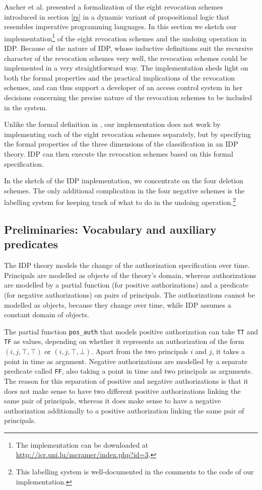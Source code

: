 \documentclass[runningheads]{llncs}
\begin{document}
Aucher et al. \cite{Aucher} presented a formalization of the eight revocation schemes introduced in section \ref{rs} in a dynamic variant of propositional logic that resembles imperative programming languages. In this section we sketch our implementation\footnote{The implementation can be downloaded at \url{http://icr.uni.lu/mcramer/index.php?id=3}.} of the eight revocation schemes and the undoing operation in IDP. Because of the nature of IDP, whose inductive definitions suit the recursive character of the revocation schemes very well, the revocation schemes could be implemented in a very straightforward way. The implementation sheds light on both the formal properties and the practical implications of the revocation schemes, and can thus support a developer of an access control system in her decisions concerning the precise nature of the revocation schemes to be included in the system.

Unlike the formal definition in \cite{Aucher}, our implementation does not work by implementing each of the eight revocation schemes separately, but by specifying the formal properties of the three dimensions of the classification in an IDP theory. IDP can then execute the revocation schemes based on this formal specification.

In the sketch of the IDP implementation, we concentrate on the four deletion schemes. The only additional complication in the four negative schemes is the labelling system for keeping track of what to do in the undoing operation.\footnote{This labelling system is well-documented in the comments to the code of our implementation.}


\subsection{Preliminaries: Vocabulary and auxiliary predicates}
The IDP theory models the change of the authorization specification over time. Principals are modelled as objects of the theory's domain, whereas authorizations are modelled by a partial function (for positive authorizations) and a predicate (for negative authorizations) on pairs of principals. The authorizations cannot be modelled as objects, because they change over time, while IDP assumes a constant domain of objects. 

The partial function \texttt{pos\_{}auth} that models positive authorization can take \texttt{TT} and \texttt{TF} as values, depending on whether it represents an authorization of the form $(i,j,\top,\top)$ or $(i,j,\top,\bot)$. Apart from the two principals $i$ and $j$, it takes a point in time as argument. Negative authorizations are modelled by a separate predicate called \texttt{FF}, also taking a point in time and two principals as arguments. The reason for this separation of positive and negative authorizations is that it does not make sense to have two different positive authorizations linking the same pair of principals, whereas it does make sense to have a negative authorization additionally to a positive authorization linking the same pair of principals.
\end{document}
